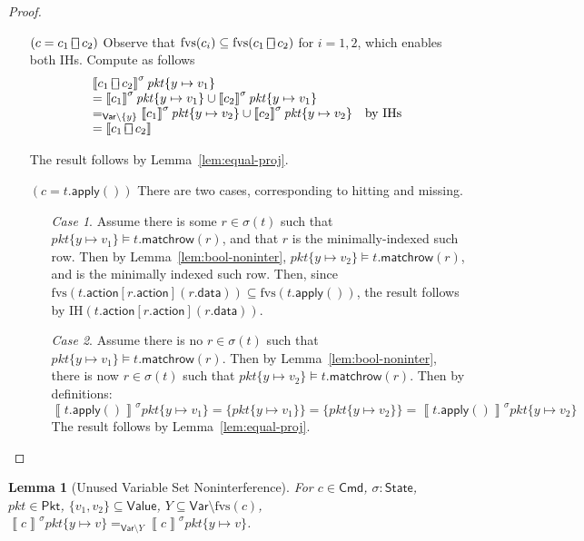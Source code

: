 \documentclass{article}
\newcommand{\pkt}{\mathit{pkt}}
\newcommand{\denote}[1]{\left\llbracket#1\right\rrbracket}
\newcommand{\Value}{\mathsf{Value}}
\newcommand{\Cmd}{\mathsf{Cmd}}
\newcommand{\Pkt}{\mathsf{Pkt}}
\newcommand{\Var}{\mathsf{Var}}
\newcommand{\State}{\mathsf{State}}
\newcommand{\action}{\mathsf{action}}
\newcommand{\data}{\mathsf{data}}
\newcommand{\apply}{\mathsf{apply}}
\newcommand{\choiceop}{\rotatebox[origin=c]{90}{$\sqsubset\!\!\!\sqsupset$}}
\newcommand{\choice}{\mathbin{\choiceop}}
\newcommand{\fvs}{\textrm{fvs}}
\newcommand{\matchrow}{\mathsf{matchrow}}
\theoremstyle{plain}
\newtheorem{lemma}{Lemma}
\theoremstyle{definition}
\theoremstyle{remark}
\begin{document}
\begin{proof}
\begin{enumerate}[align=left]
    \item[$(c = c_1 \choice c_2)$] Observe that $\fvs(c_i) \subseteq \fvs(c_1 \choice c_2)$ for
      $i = 1,2$, which enables both IHs. Compute as follows
      \[\begin{array}{ll}
      \denote{c_1 \choice c_2}^\sigma\pkt\{y \mapsto v_1\} \\
      = \denote{c_1}^\sigma\pkt\{y \mapsto v_1\} \cup \denote{c_2}^\sigma\pkt\{y \mapsto v_1\} \\
      =_{\Var \setminus \{y\}} \denote{c_1}^\sigma\pkt\{y \mapsto v_2\} \cup \denote{c_2}^\sigma\pkt\{y \mapsto v_2\}
      & \text{by IHs} \\
      = \denote{c_1 \choice c_2}
      \end{array}
      \]

      The result follows by Lemma~\ref{lem:equal-proj}.

    \item[$(c = t.\apply())$]
      There are two cases, corresponding to hitting and missing.
      \begin{enumerate}[align=left]
      \item[\textit{Case 1}.] Assume there is some $r \in \sigma(t)$ such that
        $\pkt\{y \mapsto v_1\} \models t.\matchrow(r)$, and that $r$ is the
        minimally-indexed such row. Then by Lemma~\ref{lem:bool-noninter},
        $\pkt\{y \mapsto v_2\} \models t.\matchrow(r)$, and is the minimally indexed such row. Then, since
        $\fvs(t.\action[r.\action](r.\data)) \subseteq \fvs(t.\apply())$, the
        result follows by IH$(t.\action[r.\action](r.\data))$.

        \item[\textit{Case 2}.] Assume there is no $r \in \sigma(t)$ such that
          $\pkt\{y \mapsto v_1\} \models t.\matchrow(r)$. Then by
          Lemma~\ref{lem:bool-noninter}, there is now $r \in \sigma(t)$ such
          that $\pkt\{y \mapsto v_2\} \models t.\matchrow(r)$. Then by definitions:
          \[\denote{t.\apply()}^\sigma \pkt\{y \mapsto v_1\} = \{\pkt\{y \mapsto v_1\}\} = \{\pkt\{y \mapsto v_2\}\} = \denote{t.\apply()}^\sigma \pkt\{y \mapsto v_2\}\]
          The result follows by Lemma~\ref{lem:equal-proj}.
      \end{enumerate}

  \end{enumerate}
\end{proof}


\begin{lemma}[Unused Variable Set Noninterference]
  \label{lem:param-noninter-set}
  For $c \in \Cmd$, $\sigma : \State$, $\pkt \in \Pkt$,
  $\{v_1,v_2\} \subseteq \Value$, $Y \subseteq \Var \setminus \fvs(c)$,
  $\denote{c}^\sigma \pkt\{y \mapsto v\} =_{\Var \setminus Y}\denote{c}^\sigma\pkt\{y \mapsto v\}$.
\end{lemma}
\end{document}
